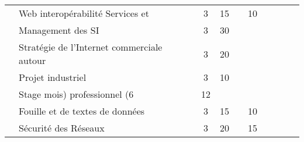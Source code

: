 \begin{tabular}{c|m{6cm}|cm{1cm}|cm{1cm}|cm{1cm}|cm{1cm}|}
 & \color{black} \mbox{Web} \mbox{interopérabilité} \mbox{Services} \mbox{et}  & \color{black} 3 & \color{black} 15 & \color{black}  & \color{black} 10 \\ \cline{2-6}
 & \cellcolor{couleurClaire} \color{couleurTexte} \mbox{Management} \mbox{des} \mbox{SI}  & \cellcolor{couleurClaire} \color{couleurTexte} 3 & \cellcolor{couleurClaire} \color{couleurTexte} 30 & \cellcolor{couleurClaire} \color{couleurTexte}  & \cellcolor{couleurClaire} \color{couleurTexte}  \\ \cline{2-6}
 & \color{black} \mbox{Stratégie} \mbox{de} \mbox{l’Internet} \mbox{commerciale} \mbox{autour}  & \color{black} 3 & \color{black} 20 & \color{black}  & \color{black}  \\ \cline{2-6}
 & \cellcolor{couleurClaire} \color{couleurTexte} \mbox{Projet} \mbox{industriel}  & \cellcolor{couleurClaire} \color{couleurTexte} 3 & \cellcolor{couleurClaire} \color{couleurTexte} 10 & \cellcolor{couleurClaire} \color{couleurTexte}  & \cellcolor{couleurClaire} \color{couleurTexte}  \\ \cline{2-6}
 & \color{black} \mbox{Stage} \mbox{mois)} \mbox{professionnel} \mbox{(6}  & \color{black} 12 & \color{black}  & \color{black}  & \color{black}  \\ \cline{2-6}
 & \cellcolor{couleurClaire} \color{couleurTexte} \mbox{Fouille} \mbox{et} \mbox{de} \mbox{textes} \mbox{de} \mbox{données}  & \cellcolor{couleurClaire} \color{couleurTexte} 3 & \cellcolor{couleurClaire} \color{couleurTexte} 15 & \cellcolor{couleurClaire} \color{couleurTexte}  & \cellcolor{couleurClaire} \color{couleurTexte} 10 \\ \cline{2-6}
 & \color{black} \mbox{Sécurité} \mbox{des} \mbox{Réseaux}  & \color{black} 3 & \color{black} 20 & \color{black}  & \color{black} 15 \\ \cline{2-6}
\hline
\end{tabular}

